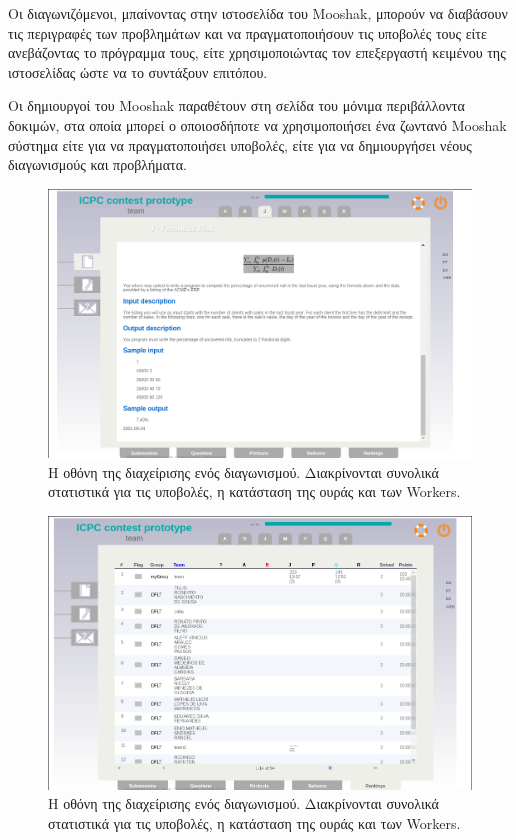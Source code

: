 \documentclass[diploma]{softlab-thesis}
\begin{document}
\bigskip

Οι διαγωνιζόμενοι, μπαίνοντας στην ιστοσελίδα του Mooshak, μπορούν να διαβάσουν
τις περιγραφές των προβλημάτων και να πραγματοποιήσουν τις υποβολές τους είτε
ανεβάζοντας το πρόγραμμα τους, είτε χρησιμοποιώντας τον επεξεργαστή κειμένου της
ιστοσελίδας ώστε να το συντάξουν επιτόπου.

\bigskip

Οι δημιουργοί του Mooshak παραθέτουν στη σελίδα του μόνιμα περιβάλλοντα δοκιμών,
στα οποία μπορεί ο οποιοσδήποτε να χρησιμοποιήσει ένα ζωντανό Mooshak σύστημα είτε
για να πραγματοποιήσει υποβολές, είτε για να δημιουργήσει νέους διαγωνισμούς και
προβλήματα.

\bigskip

\begin{figure}
  \centering
  \includegraphics[scale=0.3,trim=4 4 4 4,clip]{Figures/mooshakproblem.png}
  \caption[Οθόνη δ]{Η οθόνη της διαχείρισης ενός διαγωνισμού.
  Διακρίνονται συνολικά στατιστικά για τις υποβολές, η κατάσταση της ουράς και των
  Workers.}
\end{figure}

\begin{figure}
  \centering
  \includegraphics[scale=0.3,trim=4 4 4 4,clip]{Figures/mooshakrankings.png}
  \caption[Οθόνη διαχείρισης προβλήματος]{Η οθόνη της διαχείρισης ενός διαγωνισμού.
  Διακρίνονται συνολικά στατιστικά για τις υποβολές, η κατάσταση της ουράς και των
  Workers.}
\end{figure}
\end{document}

